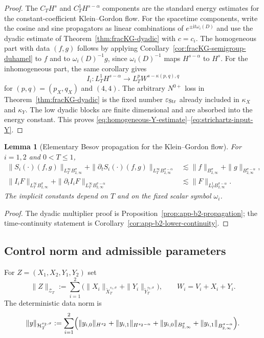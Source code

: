 \documentclass[10pt]{amsart}
\numberwithin{equation}{section}
\theoremstyle{plain}
\newtheorem{lemma}[theorem]{Lemma}
\theoremstyle{definition}
\theoremstyle{remark}
\newcommand{\calZ}{\mathcal{Z}}
\newcommand{\Btwo}{B_{2,\infty}}
\newcommand{\eps}{\varepsilon}
\newcommand{\ii}{\mathrm{i}}
\begin{document}
\begin{proof}
The $C_TH^s$ and $C_T^1H^{s-\alpha}$ components are the standard energy estimates for the constant-coefficient Klein--Gordon flow.  For the spacetime components, write the cosine and sine propagators as linear combinations of $e^{\pm \ii t\omega_i(D)}$ and use the dyadic estimate of Theorem~\ref{thm:fracKG-dyadic} with $c=c_i$.  The homogeneous part with data $(f,g)$ follows by applying Corollary~\ref{cor:fracKG-semigroup-duhamel} to $f$ and to $\omega_i(D)^{-1}g$, since $\omega_i(D)^{-1}$ maps $H^{s-\alpha}$ to $H^s$.  For the inhomogeneous part, the same corollary gives
\begin{equation*}
        I_i:L_T^1H^{s-\alpha}\longrightarrow L_T^pW^{s-\kappa(p,q),q}
\end{equation*}
for $(p,q)=(p_X,q_X)$ and $(4,4)$.  The arbitrary $N^{0+}$ loss in Theorem~\ref{thm:fracKG-dyadic} is the fixed number $\eps_{\rm Str}$ already included in $\kappa_X$ and $\kappa_Y$.  The low dyadic blocks are finite dimensional and are absorbed into the energy constant.  This proves \eqref{eq:homogeneous-Y-estimate}--\eqref{eq:strichartz-input-Y}.
\end{proof}

\begin{lemma}[Elementary Besov propagation for the Klein--Gordon flow]\label{lem:elementary-besov-propagation}
For $i=1,2$ and $0<T\le1$,
\begin{align}
 \|S_i(\cdot)(f,g)\|_{L_T^\infty\Btwo^\sigma}
 +\|\partial_tS_i(\cdot)(f,g)\|_{L_T^\infty\Btwo^{\sigma-\alpha}}
 &\lesssim \|f\|_{\Btwo^\sigma}+\|g\|_{\Btwo^{\sigma-\alpha}},
 \label{eq:homogeneous-besov-estimate}\\
 \|I_iF\|_{L_T^\infty\Btwo^\sigma}
 +\|\partial_tI_iF\|_{L_T^\infty\Btwo^{\sigma-\alpha}}
 &\lesssim \|F\|_{L_T^1\Btwo^{\sigma-\alpha}}.
 \label{eq:besov-input-dh}
\end{align}
The implicit constants depend on $T$ and on the fixed scalar symbol $\omega_i$.
\end{lemma}

\begin{proof}
The dyadic multiplier proof is Proposition~\ref{prop:app-b2-propagation}; the time-continuity statement is Corollary~\ref{cor:app-b2-lower-continuity}.
\end{proof}



\subsection{Control norm and admissible parameters}
For $Z=(X_1,X_2,Y_1,Y_2)$ set
\begin{equation}\label{eq:ZJ-norm}
\|Z\|_{\calZ_T}:=\sum_{i=1}^2\bigl(
\|X_i\|_{\widetilde X_T^{s_1,\sigma}}+
\|Y_i\|_{\widetilde Y_T^{s_2,\sigma}}
\bigr),
\qquad W_i=V_i+X_i+Y_i.
\end{equation}
The deterministic data norm is
\begin{equation}\label{eq:data-norm-Y}
\|y\|_{\mathcal H_T^{s_2,\sigma}}:=
\sum_{i=1}^2\Bigl(
\|y_{i,0}\|_{H^{s_2}}+\|y_{i,1}\|_{H^{s_2-\alpha}}
+\|y_{i,0}\|_{\Btwo^\sigma}+\|y_{i,1}\|_{\Btwo^{\sigma-\alpha}}
\Bigr).
\end{equation}
\end{document}
